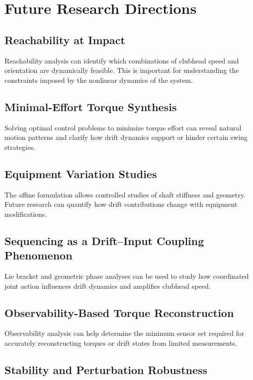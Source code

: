 \documentclass[12pt]{article}
\begin{document}
\section{Future Research Directions}

\subsection{Reachability at Impact}

Reachability analysis can identify which combinations of clubhead speed and orientation are dynamically feasible. This is important for understanding the constraints imposed by the nonlinear dynamics of the system.

\subsection{Minimal-Effort Torque Synthesis}

Solving optimal control problems to minimize torque effort can reveal natural motion patterns and clarify how drift dynamics support or hinder certain swing strategies.

\subsection{Equipment Variation Studies}

The affine formulation allows controlled studies of shaft stiffness and geometry. Future research can quantify how drift contributions change with equipment modifications.

\subsection{Sequencing as a Drift--Input Coupling Phenomenon}

Lie bracket and geometric phase analyses can be used to study how coordinated joint action influences drift dynamics and amplifies clubhead speed.

\subsection{Observability-Based Torque Reconstruction}

Observability analysis can help determine the minimum sensor set required for accurately reconstructing torques or drift states from limited measurements.

\subsection{Stability and Perturbation Robustness}
\end{document}
